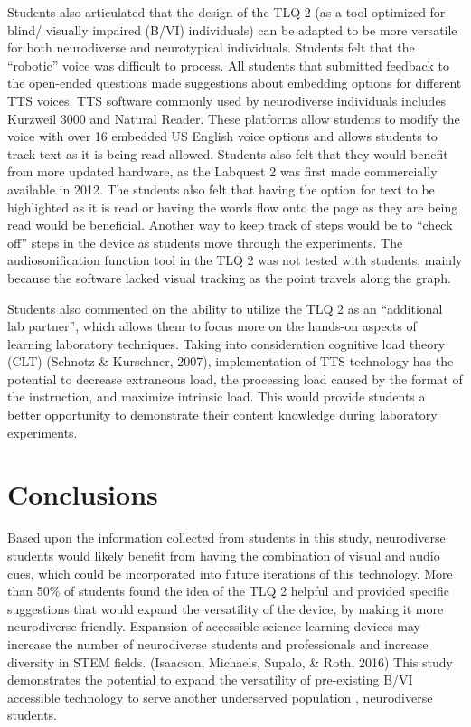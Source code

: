 \documentclass[11.5pt]{sig-alternate}
\begin{document}
\begin{large}
Students also articulated that the design of the TLQ 2 (as a tool optimized for blind/ visually impaired (B/VI) individuals) can be adapted to be more versatile for both neurodiverse and neurotypical individuals.  Students felt that the “robotic” voice was difficult to process.  All students that submitted feedback to the open-ended questions made suggestions about embedding options for different TTS voices.  TTS software commonly used by neurodiverse individuals includes Kurzweil 3000 and Natural Reader.  These platforms allow students to modify the voice with over 16 embedded US English voice options and allows students to track text as it is being read allowed.   Students also felt that they would benefit from more updated hardware, as the Labquest 2 was first made commercially available in 2012.  The students also felt that having the option for text to be highlighted as it is read or having the words flow onto the page as they are being read would be beneficial.  Another way to keep track of steps would be to “check off” steps in the device as students move through the experiments.  The audiosonification function tool in the TLQ 2 was not tested with students, mainly because the software lacked visual tracking as the point travels along the graph.

Students also commented on the ability to utilize the TLQ 2 as an “additional lab partner”, which allows them to focus more on the hands-on aspects of learning laboratory techniques.  Taking into consideration cognitive load theory (CLT) (Schnotz \& Kurschner, 2007), implementation of TTS technology has the potential to decrease extraneous load, the processing load caused by the format of the instruction, and maximize intrinsic load.  This would provide students a better opportunity to demonstrate their content knowledge during laboratory experiments.   

\section*{Conclusions}
Based upon the information collected from students in this study, neurodiverse students would likely benefit from having the combination of visual and audio cues, which could be incorporated into future iterations of this technology.  More than 50\% of students found the idea of the TLQ 2 helpful and provided specific suggestions that would expand the versatility of the device, by making it more neurodiverse friendly.  Expansion of accessible science learning devices may increase the number of neurodiverse students and professionals  and increase diversity in STEM fields. (Isaacson, Michaels, Supalo, \& Roth, 2016)  This study demonstrates the potential to expand the versatility of pre-existing B/VI accessible technology to serve another underserved population , neurodiverse students.  


\end{large}
\end{document}

